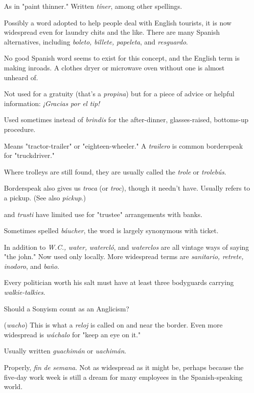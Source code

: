  As in "paint thinner." Written \emph{tíner}, among other
spellings.

 Possibly a word adopted to help people deal with English tourists, it is now widespread even for laundry chits and the like.
There are many Spanish alternatives, including \emph{boleto, billete, papeleta}, and \emph{resguardo}.

 No good Spanish word seems to exist for this concept,
and the English term is making inroads. A clothes dryer or microwave
oven without one is almost unheard of.

 Not used for a gratuity (that's a \emph{propina}) but for a piece of
advice or helpful information: \emph{¡Gracias por el tip!}

 Used sometimes instead of \emph{brindis} for the after-dinner, glasses-raised, bottoms-up procedure.

 Means "tractor-trailer" or "eighteen-wheeler." A
\emph{trailero} is common borderspeak for "truckdriver."

 Where trolleys are still found, they are usually
called the \emph{trole} or \emph{trolebús}.

 Borderspeak also gives us \emph{troca} (or \emph{troc}), though it
needn't have. Usually refers to a pickup. (See also \emph{pickup}.)

 and \emph{trusti} have limited use for
"trustee" arrangements with banks.

 Sometimes spelled \emph{báucher}, the word is largely
synonymous with ticket.

 In addition to \emph{W.C., water, watercló}, and \emph{waterclos} are
all vintage ways of saying "the john." Now used only locally. More
widespread terms are \emph{sanitario, retrete, inodoro}, and \emph{baño}.

 Every politician worth his salt must have at
least three bodyguards carrying \emph{walkie-talkies}.

 Should a Sonyism count as an Anglicism?

 (\emph{wacho}) This is what a \emph{reloj} is called on and near the
border. Even more widespread is \emph{wáchalo} for "keep an eye on it."

 Usually written \emph{guachimán} or \emph{uachimán}.

 Properly, \emph{fin de semana}. Not as widespread as it
might be, perhaps because the five-day work week is still a dream for
many employees in the Spanish-speaking world.

